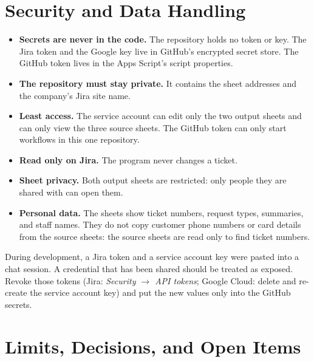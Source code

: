 \documentclass[11pt,a4paper]{article}
\let\oldsection\section
\renewcommand{\section}{\needspace{12\baselineskip}\oldsection}
\begin{document}
\section{Security and Data Handling}
\label{ch:security}

\begin{itemize}
  \item \textbf{Secrets are never in the code.} The repository holds no token or key. The Jira token and the Google key
    live in GitHub's encrypted secret store. The GitHub token lives in the Apps Script's script properties.
  \item \textbf{The repository must stay private.} It contains the sheet addresses and the company's Jira site name.
  \item \textbf{Least access.} The service account can edit only the two output sheets and can only view the three
    source sheets. The GitHub token can only start workflows in this one repository.
  \item \textbf{Read only on Jira.} The program never changes a ticket.
  \item \textbf{Sheet privacy.} Both output sheets are restricted: only people they are shared with can open them.
  \item \textbf{Personal data.} The sheets show ticket numbers, request types, summaries, and staff names. They do not
    copy customer phone numbers or card details from the source sheets: the source sheets are read only to find ticket
    numbers.
\end{itemize}

\begin{warning}
During development, a Jira token and a service account key were pasted into a chat session. A credential that has been
shared should be treated as exposed. Revoke those tokens (Jira: \emph{Security $\rightarrow$ API tokens}; Google Cloud:
delete and re-create the service account key) and put the new values only into the GitHub secrets.
\end{warning}

\section{Limits, Decisions, and Open Items}
\end{document}
